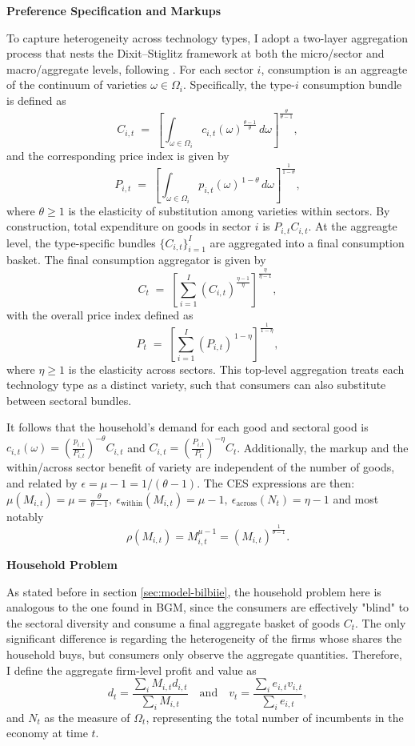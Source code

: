 \documentclass[a4paper,12pt]{article} %
\numberwithin{equation}{section} %
\numberwithin{figure}{section}
\numberwithin{table}{section}
\begin{document}
\medskip
\medskip
\noindent\textbf{Preference Specification and Markups}
\medskip

To capture heterogeneity across technology types, I adopt a two-layer aggregation process that nests the Dixit--Stiglitz framework at both 
the micro/sector and macro/aggregate levels, following \textcite{carvalho2021sectoral}. For each sector $i$, consumption is an aggreagte of the
continuum of varieties \(\omega \in \Omega_i\). Specifically, the type-\(i\) consumption bundle is defined as
\[
C_{i,t} \;=\; \left[ \int_{\omega \in \Omega_i} c_{i,t}(\omega)^{\frac{\theta-1}{\theta}}\,d\omega \right]^{\frac{\theta}{\theta-1}},
\]
and the corresponding price index is given by
\[
P_{i,t} \;=\; \left[ \int_{\omega \in \Omega_i} p_{i,t}(\omega)^{\,1-\theta}\,d\omega \right]^{\frac{1}{1-\theta}},
\]
where \(\theta \ge 1\) is the elasticity of substitution among varieties within sectors. By construction, total expenditure on goods in 
sector \(i\) is \(P_{i,t}C_{i,t}\). At the aggreagte level, the type-specific bundles \(\{C_{i,t}\}_{i=1}^I\) are 
aggregated into a final consumption basket. The final consumption aggregator is given by
\[
C_t \;=\; \left[ \sum_{i=1}^I \left( C_{i,t} \right)^{\frac{\eta-1}{\eta}} \right]^{\frac{\eta}{\eta-1}},
\]
with the overall price index defined as
\[
P_t \;=\; \left[ \sum_{i=1}^I \left( P_{i,t} \right)^{\,1-\eta} \right]^{\frac{1}{1-\eta}},
\]
where $\eta \ge 1$ is the elasticity across sectors. This top-level aggregation treats each technology type as a distinct variety, 
such that consumers can also substitute between sectoral bundles.

It follows that the household's demand for each good and sectoral good is 
$c_{i,t}(\omega) = \left(\frac{p_{i,t}}{P_{i,t}}\right)^{-\theta}C_{i,t}$ and 
$C_{i,t} = \left(\frac{P_{i,t}}{P_t}\right)^{-\eta}C_t$. Additionally, the markup and the within/across sector benefit of variety are 
independent of the number of goods, and related by $\epsilon = \mu -1 = 1/ (\theta-1)$. The CES expressions are then: 
$\mu(M_{i,t}) = \mu = \frac{\theta}{\theta - 1}, 
\   \epsilon_{\text{within}}(M_{i,t}) = \mu - 1 , \ \epsilon_{\text{across}}(N_{t}) = \eta - 1$ and most notably 
\begin{equation}
  \rho(M_{i,t}) = M_{i,t}^{\mu - 1} = \left(M_{i,t}\right)^{\frac{1}{\theta - 1}}. \label{eq:lovevariety}
\end{equation}

\medskip
\medskip
\noindent\textbf{Household Problem}
\medskip

As stated before in section \ref{sec:model-bilbiie}, the household problem here is analogous to the one found in BGM, since the consumers are
effectively "blind" to the sectoral diversity and consume a final aggregate basket of goods $C_t$. The only significant difference is regarding
the heterogeneity of the firms whose shares the household buys, but consumers only observe the aggregate quantities. Therefore, I define the aggregate
firm-level profit and value as 
$$
    d_{t} = \frac{\sum_iM_{i,t}d_{i,t}}{\sum_iM_{i,t}} \quad \text{and} \quad v_{t} = \frac{\sum_ie_{i,t}v_{i,t}}{\sum_ie_{i,t}},
$$
and $N_t$ as the measure of $\Omega_t$, representing the total number of incumbents in the economy at time $t$.
\end{document}
